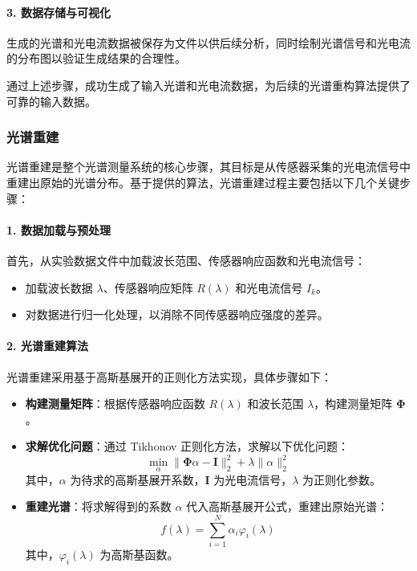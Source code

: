 \documentclass[12pt,hyperref,a4paper,UTF8]{ctexart}
\begin{document}
\paragraph{3. 数据存储与可视化}
生成的光谱和光电流数据被保存为文件以供后续分析，同时绘制光谱信号和光电流的分布图以验证生成结果的合理性。

通过上述步骤，成功生成了输入光谱和光电流数据，为后续的光谱重构算法提供了可靠的输入数据。

\subsubsection*{光谱重建}

光谱重建是整个光谱测量系统的核心步骤，其目标是从传感器采集的光电流信号中重建出原始的光谱分布。基于提供的算法，光谱重建过程主要包括以下几个关键步骤：

\paragraph{1. 数据加载与预处理}
首先，从实验数据文件中加载波长范围、传感器响应函数和光电流信号：
\begin{itemize}
    \item 加载波长数据 \(\lambda\)、传感器响应矩阵 \(R(\lambda)\) 和光电流信号 \(I_k\)。
    \item 对数据进行归一化处理，以消除不同传感器响应强度的差异。
\end{itemize}

\paragraph{2. 光谱重建算法}
光谱重建采用基于高斯基展开的正则化方法实现，具体步骤如下：
\begin{itemize}
    \item \textbf{构建测量矩阵}：根据传感器响应函数 \(R(\lambda)\) 和波长范围 \(\lambda\)，构建测量矩阵 \(\mathbf{\Phi}\)。
    \item \textbf{求解优化问题}：通过 Tikhonov 正则化方法，求解以下优化问题：
    \[
    \min_{\alpha} \|\mathbf{\Phi} \alpha - \mathbf{I}\|_2^2 + \lambda \|\alpha\|_2^2
    \]
    其中，\(\alpha\) 为待求的高斯基展开系数，\(\mathbf{I}\) 为光电流信号，\(\lambda\) 为正则化参数。
    \item \textbf{重建光谱}：将求解得到的系数 \(\alpha\) 代入高斯基展开公式，重建出原始光谱：
    \[
    f(\lambda) = \sum_{i=1}^{N} \alpha_i \varphi_i(\lambda)
    \]
    其中，\(\varphi_i(\lambda)\) 为高斯基函数。
\end{itemize}
\end{document}

